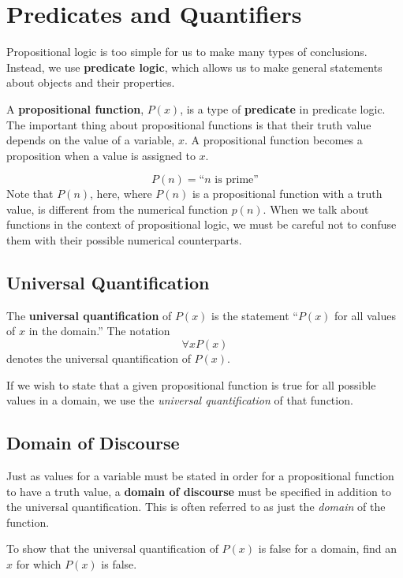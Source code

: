 \chapter{Predicates and Quantifiers}

Propositional logic is too simple for us to make many types of conclusions.
Instead, we use \textbf{predicate logic}, which allows us to make general
statements about objects and their properties.

A \textbf{propositional function}, $P(x)$, is a
type of \textbf{predicate} in
predicate logic. The important thing about propositional functions is that their
truth value depends on the value of a variable, $x$. A propositional function
becomes a proposition when a value is assigned to $x$.
\begin{ex}
  \[ P(n)=\text{``$n$ is prime''} \]
  Note that $P(n)$, here, where $P(n)$ is a propositional function with a truth value,
  is different from the numerical function $p(n)$. When we talk about functions in the
  context of propositional logic, we must be careful not to confuse them with their possible
  numerical counterparts.
\end{ex}

\section{Universal Quantification}
The \textbf{universal quantification} of $P(x)$ is the statement
    ``$P(x)$ for all values of $x$ in the domain.''
  The notation \[\forall x P(x)\] denotes the universal quantification of $P(x)$.

If we wish to state that a given propositional function is true for all possible values in a domain, we use the \emph{universal quantification} of that function.

\section{Domain of Discourse}
Just as values for a variable must be stated in order for a propositional function to have a truth value, a \textbf{domain of discourse} must be specified in addition to the universal quantification.
This is often referred to as just the \emph{domain} of the function.

To show that the universal quantification of $P(x)$ is false for a domain, find
an $x$ for which $P(x)$ is false.

